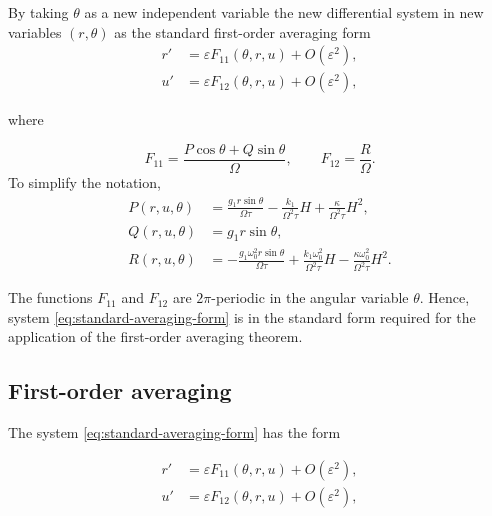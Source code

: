 \documentclass[11pt,reqno]{amsart}
\theoremstyle{plain}
\theoremstyle{definition}
\theoremstyle{remark}
\begin{document}
By taking $\theta$ as a new independent variable the new differential system in new variables $(r,\theta)$ as the standard first-order averaging form
\begin{equation}
\label{eq:standard-averaging-form}
\begin{aligned}
r'
&=
\varepsilon
F_{11}(\theta,r,u)
+
O(\varepsilon^2),
\\[2mm]
u'
&=
\varepsilon
F_{12}(\theta,r,u)
+
O(\varepsilon^2),
\end{aligned}
\end{equation}

where

\begin{equation}
\label{eq:F11F12}
F_{11}
=
\frac{P\cos\theta+Q\sin\theta}{\Omega},
\qquad
F_{12}
=
\frac{R}{\Omega}.
\end{equation}
To simplify the notation, 
\begin{equation}
\label{eq:PQR}
\begin{aligned}
P(r,u,\theta)
&=
\frac{g_1r\sin\theta}{\Omega\tau}
-\frac{k_1}{\Omega^2\tau}H
+\frac{\kappa}{\Omega^2\tau}H^2,
\\[2mm]
Q(r,u,\theta)
&=
g_1r\sin\theta,
\\[2mm]
R(r,u,\theta)
&=
-\frac{g_1\omega_0^2r\sin\theta}
{\Omega\tau}
+\frac{k_1\omega_0^2}
{\Omega^2\tau}H
-\frac{\kappa\omega_0^2}
{\Omega^2\tau}H^2.
\end{aligned}
\end{equation}

The functions $F_{11}$ and $F_{12}$ are $2\pi$-periodic in the angular
variable $\theta$. Hence, system
\eqref{eq:standard-averaging-form} is in the standard form required for
the application of the first-order averaging theorem.

\subsection{First-order averaging}

The system \eqref{eq:standard-averaging-form} has the form

\begin{equation}
\label{eq:standard-averaging}
\begin{aligned}
r'
&=
\varepsilon
F_{11}(\theta,r,u)
+
O(\varepsilon^2),
\\
u'
&=
\varepsilon
F_{12}(\theta,r,u)
+
O(\varepsilon^2),
\end{aligned}
\end{equation}
\end{document}

